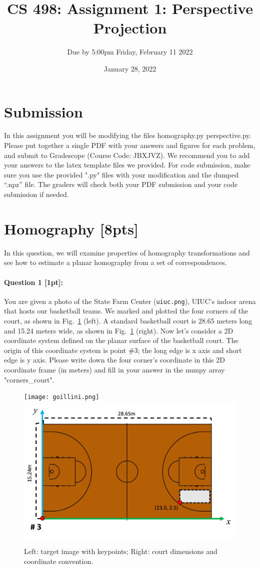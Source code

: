 \documentclass[11pt]{article}
\begin{document}
\author{Due by 5:00pm Friday, February 11 2022}
\title{CS 498: Assignment 1: Perspective Projection}
\date{January 28, 2022}
\maketitle

\medskip


\section*{Submission}

In this assignment you will be modifying the files homography.py perspective.py.
Please put together a single PDF with your answers and figures for each problem, and submit to Gradescope (Course Code: JBXJVZ). We recommend you to add your answers to the latex template files we provided. For code submission, make sure you use the provided ".py" files with your modification and the dumped ``.npz'' file. The graders will check both your PDF submission and your code submission if needed. 


\section*{Homography [8pts]}

In this question, we will examine properties of homography transformations and see how to estimate a planar homography from a set of correspondences. 

\paragraph{Question 1 [1pt]:} You are given a photo of the State Farm Center (\texttt{uiuc.png}), UIUC's indoor arena that hosts our basketball teams. We marked and plotted the four corners of the court, as shown in Fig.~\ref{fig:intro} (left). A standard basketball court is 28.65 meters long and 15.24 meters wide, as shown in Fig.~\ref{fig:intro} (right). Now let's consider a 2D coordinate system defined on the planar surface of the basketball court. The origin of this coordinate system is point \#3; the long edge is x axis and short edge is y axis. Please write down the four corner's coordinate in this 2D coordinate frame (in meters) and fill in your answer in the numpy array "corners\_court". 

\begin{figure}[htbp]
\small
\texttt{[image: goillini.png]}
\includegraphics[width=0.5\linewidth]{coordinate.png}
\caption{ Left: target image with keypoints; Right: court dimensions and coordinate convention.}
\label{fig:intro}
\end{figure}
\end{document}
